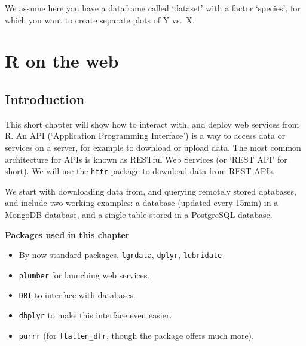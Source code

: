 \documentclass[]{book}
\newenvironment{Shaded}{\begin{snugshade}}{\end{snugshade}}
\newcommand{\ControlFlowTok}[1]{\textcolor[rgb]{0.13,0.29,0.53}{\textbf{#1}}}
\newcommand{\DataTypeTok}[1]{\textcolor[rgb]{0.13,0.29,0.53}{#1}}
\newcommand{\KeywordTok}[1]{\textcolor[rgb]{0.13,0.29,0.53}{\textbf{#1}}}
\newcommand{\NormalTok}[1]{#1}
\newcommand{\OperatorTok}[1]{\textcolor[rgb]{0.81,0.36,0.00}{\textbf{#1}}}
\newcommand{\OtherTok}[1]{\textcolor[rgb]{0.56,0.35,0.01}{#1}}
\newcommand{\StringTok}[1]{\textcolor[rgb]{0.31,0.60,0.02}{#1}}
\providecommand{\tightlist}{%
  \setlength{\itemsep}{0pt}\setlength{\parskip}{0pt}}
\begin{document}
We assume here you have a dataframe called `dataset' with a factor `species', for which you want to create separate plots of Y vs.~X.

\begin{Shaded}
\end{Shaded}

\hypertarget{webservices}{%
\chapter{R on the web}\label{webservices}}

\hypertarget{introduction-4}{%
\section{Introduction}\label{introduction-4}}

This short chapter will show how to interact with, and deploy web services from R. An API (`Application Programming Interface') is a way to access data or services on a server, for example to download or upload data. The most common architecture for APIs is known as RESTful Web Services (or `REST API' for short). We will use the \texttt{httr} package to download data from REST APIs.

We start with downloading data from, and querying remotely stored databases, and include two working examples: a database (updated every 15min) in a MongoDB database, and a single table stored in a PostgreSQL database.

\textbf{Packages used in this chapter}

\begin{itemize}
\tightlist
\item
  By now standard packages, \texttt{lgrdata}, \texttt{dplyr}, \texttt{lubridate}
\item
  \texttt{plumber} for launching web services.
\item
  \texttt{DBI} to interface with databases.
\item
  \texttt{dbplyr} to make this interface even easier.
\item
  \texttt{purrr} (for \texttt{flatten\_dfr}, though the package offers much more).
\end{itemize}
\end{document}
